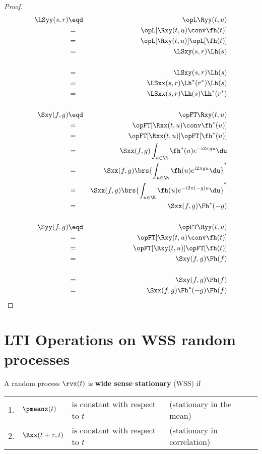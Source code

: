 \begin{proof}
\begin{eqnarray*}
   \LSyy(s,r)
     &\eqd& \opL\Ryy(t,u)
   \\&=&    \opL[\Rxy(t,u) \conv \fh(t)]
   \\&=&    \opL[\Rxy(t,u)]\opL[\fh(t)]
   \\&=&    \LSxy(s,r) \Lh(s)
\\
   \\&=&    \LSxy(s,r) \Lh(s)
   \\&=&    \LSxx(s,r) \Lh^\ast(r^\ast)\Lh(s)
   \\&=&    \LSxx(s,r) \Lh(s) \Lh^\ast(r^\ast)
\\ \\
   \Sxy(f,g)
     &\eqd& \opFT\Rxy(t,u)
   \\&=&    \opFT[\Rxx(t,u) \conv \fh^\ast(u)]
   \\&=&    \opFT[\Rxx(t,u)]\opFT[\fh^\ast(u)]
   \\&=&    \Sxx(f,g) \int_{u\in\R}\fh^\ast(u) e^{-i2\pi g u} \du
   \\&=&    \Sxx(f,g) \brs{\int_{u\in\R}\fh(u) e^{i2\pi g u} \du }^\ast
   \\&=&    \Sxx(f,g) \brs{\int_{u\in\R}\fh(u) e^{-i2\pi(-g)u} \du }^\ast
   \\&=&    \Sxx(f,g) \Fh^\ast(-g)
\\ \\
   \Syy(f,g)
     &\eqd& \opFT\Ryy(t,u)
   \\&=&    \opFT[\Rxy(t,u) \conv \fh(t)]
   \\&=&    \opFT[\Rxy(t,u)]\opFT[\fh(t)]
   \\&=&    \Sxy(f,g) \Fh(f)
\\
   \\&=&    \Sxy(f,g) \Fh(f)
   \\&=&    \Sxx(f,g) \Fh^\ast(-g) \Fh(f)
\end{eqnarray*}
\end{proof}


\section{LTI Operations on WSS random processes}
\begin{definition}
\label{def:wss}
A random process $\rvx(t)$ is \textbf{wide sense stationary} (WSS) if

\begin{tabular}{llll}
   1. & $\pmeanx(t)$         & is constant with respect to $t$ & (stationary in the mean) \\
   2. & $\Rxx(t+\tau,t)$ & is constant with respect to $t$ & (stationary in correlation)
\end{tabular}
\end{definition}

